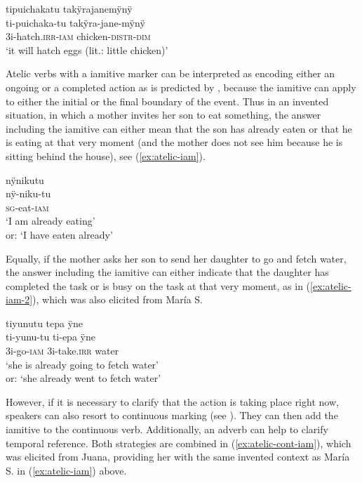 \ea\label{ex:breed-iam}
\begingl
\glpreamble tipuichakatu takÿrajanemÿnÿ\\
\gla ti-puichaka-tu takÿra-jane-mÿnÿ\\
\glb 3i-hatch.\textsc{irr}-\textsc{iam} chicken-\textsc{distr}-\textsc{dim}\\
\glft ‘it will hatch eggs (lit.: little chicken)’
\endgl
\trailingcitation{[jxx-e110923l-2.086]}
\xe

Atelic verbs with a iamitive marker can be interpreted as encoding either an ongoing or a completed action as is predicted by \citet[19]{Olsson2013}, because the iamitive can apply to either the initial or the final boundary of the event. Thus in an invented situation, in which a mother invites her son to eat something, the answer including the iamitive can either mean that the son has already eaten or that he is eating at that very moment (and the mother does not see him because he is sitting behind the house), see (\ref{ex:atelic-iam}). 

\ea\label{ex:atelic-iam}
\begingl
\glpreamble nÿnikutu\\
\gla nÿ-niku-tu\\
\textsc{sg}-eat-\textsc{iam}\\
\glft ‘I am already eating’\\ or: ‘I have eaten already’
\endgl
{}
\xe
{}

Equally, if the mother asks her son to send her daughter to go and fetch water, the answer including the iamitive can either indicate that the daughter has completed the task or is busy on the task at that very moment, as in (\ref{ex:atelic-iam-2}), which was also elicited from María S.

\ea\label{ex:atelic-iam-2}
\begingl
\glpreamble tiyunutu tepa ÿne\\
\gla ti-yunu-tu ti-epa ÿne\\
\glb 3i-go-\textsc{iam} 3i-take.\textsc{irr} water\\
\glft ‘she is already going to fetch water’\\or: ‘she already went to fetch water’
\endgl
\trailingcitation{[rxx-e181022le]}
\xe
{}

However, if it is necessary to clarify that the action is taking place right now, speakers can also resort to continuous marking (see ). They can then add the iamitive to the continuous verb. Additionally, an adverb can help to clarify temporal reference. Both strategies are combined in (\ref{ex:atelic-cont-iam}), which was elicited from Juana, providing her with the same invented context as María S. in (\ref{ex:atelic-iam}) above.


